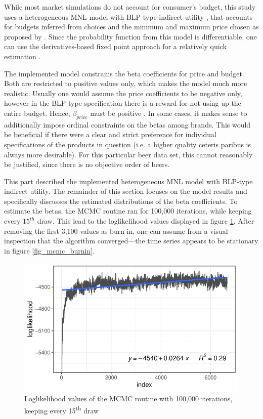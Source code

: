 \documentclass[12pt,a4paper]{article}
\begin{document}
While most market simulations do not account for consumer's budget, this study uses a heterogeneous MNL model with BLP-type indirect utility \citep{berryAutomobilePricesMarket1995}, that accounts for budgets inferred from choices and the minimum and maximum price chosen as proposed by \cite{pachaliPerilsIgnoringBudget2017}.
Since the probability function from this model is differentiable, one can use the derivatives-based fixed point approach for a relatively quick estimation \citep{morrowFixedPointApproachesComputing2011a}.

The implemented model constrains the beta coefficients for price and budget.
Both are restricted to positive values only, which makes the model much more realistic.
Usually one would assume the price coefficients to be negative only, however in the BLP-type specification there is a reward for not using up the entire budget. Hence, $\beta_{price}$ must be positive \citep{pachaliPerilsIgnoringBudget2017}.
In some cases, it makes sense to additionally impose ordinal constraints on the betas among brands.
This would be beneficial if there were a clear and strict preference for individual specifications of the products in question (i.e. a higher quality ceteris paribus is always more desirable).
For this particular beer data set, this cannot reasonably be justified, since there is no objective order of beers.

This part described the implemented heterogeneous MNL model with BLP-type indirect utility.
The remainder of this section focuses on the model results and specifically discusses the estimated distributions of the beta coefficients.
To estimate the betas, the MCMC routine ran for 100,000 iterations, while keeping every $15^{th}$ draw.
This lead to the loglikelihood values displayed in figure \ref{fig_mcmc}.
After removing the first 3,100 values as burn-in, one can assume from a visual inspection that the algorithm converged---the time series appears to be stationary in figure \ref{fig_mcmc_burnin}.

\begin{figure}[ht]
	\centering
  \includegraphics[scale = 0.8]{figures/mcmc_before_burnin_fitted.pdf}
	\caption{Loglikelihood values of the MCMC routine with 100,000 iterations, keeping every 15\textsuperscript{th} draw}
	\label{fig_mcmc}
\end{figure}
\end{document}
